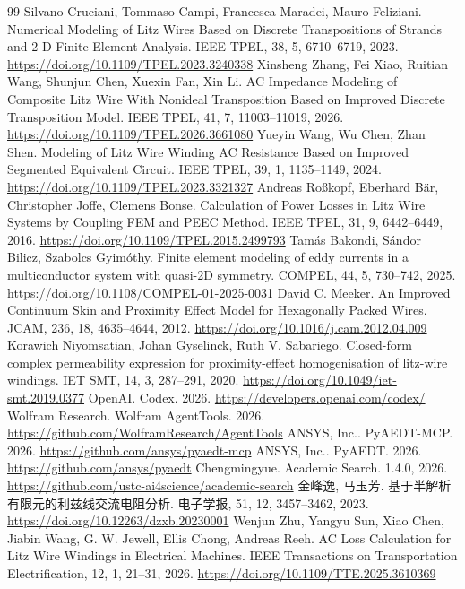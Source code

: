 \begin{thebibliography}{99}
 Silvano Cruciani, Tommaso Campi, Francesca Maradei, Mauro Feliziani. Numerical Modeling of Litz Wires Based on Discrete Transpositions of Strands and 2-D Finite Element Analysis. IEEE TPEL, 38, 5, 6710--6719, 2023. \url{https://doi.org/10.1109/TPEL.2023.3240338}
 Xinsheng Zhang, Fei Xiao, Ruitian Wang, Shunjun Chen, Xuexin Fan, Xin Li. AC Impedance Modeling of Composite Litz Wire With Nonideal Transposition Based on Improved Discrete Transposition Model. IEEE TPEL, 41, 7, 11003--11019, 2026. \url{https://doi.org/10.1109/TPEL.2026.3661080}
 Yueyin Wang, Wu Chen, Zhan Shen. Modeling of Litz Wire Winding AC Resistance Based on Improved Segmented Equivalent Circuit. IEEE TPEL, 39, 1, 1135--1149, 2024. \url{https://doi.org/10.1109/TPEL.2023.3321327}
 Andreas Roßkopf, Eberhard Bär, Christopher Joffe, Clemens Bonse. Calculation of Power Losses in Litz Wire Systems by Coupling FEM and PEEC Method. IEEE TPEL, 31, 9, 6442--6449, 2016. \url{https://doi.org/10.1109/TPEL.2015.2499793}
 Tamás Bakondi, Sándor Bilicz, Szabolcs Gyimóthy. Finite element modeling of eddy currents in a multiconductor system with quasi-2D symmetry. COMPEL, 44, 5, 730--742, 2025. \url{https://doi.org/10.1108/COMPEL-01-2025-0031}
 David C. Meeker. An Improved Continuum Skin and Proximity Effect Model for Hexagonally Packed Wires. JCAM, 236, 18, 4635--4644, 2012. \url{https://doi.org/10.1016/j.cam.2012.04.009}
 Korawich Niyomsatian, Johan Gyselinck, Ruth V. Sabariego. Closed-form complex permeability expression for proximity-effect homogenisation of litz-wire windings. IET SMT, 14, 3, 287--291, 2020. \url{https://doi.org/10.1049/iet-smt.2019.0377}
 OpenAI. Codex. 2026. \url{https://developers.openai.com/codex/}
 Wolfram Research. Wolfram AgentTools. 2026. \url{https://github.com/WolframResearch/AgentTools}
 ANSYS, Inc.. PyAEDT-MCP. 2026. \url{https://github.com/ansys/pyaedt-mcp}
 ANSYS, Inc.. PyAEDT. 2026. \url{https://github.com/ansys/pyaedt}
 Chengmingyue. Academic Search. 1.4.0, 2026. \url{https://github.com/ustc-ai4science/academic-search}
 金峰逸, 马玉芳. 基于半解析有限元的利兹线交流电阻分析. 电子学报, 51, 12, 3457--3462, 2023. \url{https://doi.org/10.12263/dzxb.20230001}
 Wenjun Zhu, Yangyu Sun, Xiao Chen, Jiabin Wang, G. W. Jewell, Ellis Chong, Andreas Reeh. AC Loss Calculation for Litz Wire Windings in Electrical Machines. IEEE Transactions on Transportation Electrification, 12, 1, 21--31, 2026. \url{https://doi.org/10.1109/TTE.2025.3610369}

\end{thebibliography}
